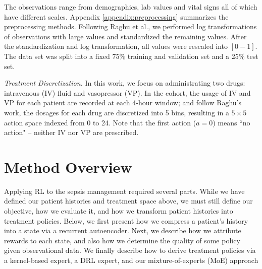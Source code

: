\documentclass[10pt]{amia}
\begin{document}

The observations range from demographics, lab values and vital signs all of which have different scales.  Appendix  \ref{appendix:preprocessing} summarizes the preprocessing methods. Following Raghu et al., \cite{DBLP:journals/corr/RaghuKCSG17} we performed log transformations of observations with large values and standardized the remaining values. After the standardization and log transformation, all values were rescaled into $[0-1]$.  The data set was split into a fixed 75\% training and validation set and a 25\% test set. 

\textit{Treatment Discretization.} In this work, we focus on administrating two drugs: intravenous (IV) fluid and vasopressor (VP). In the cohort, the usage of IV and VP for each patient are recorded at each 4-hour window; and follow Raghu's work\cite{DBLP:journals/corr/RaghuKCSG17}, the dosages for each drug are discretized into 5 bins, resulting in a $5\times5$ action space indexed from 0 to 24. Note that the first action ($a=0$) means ``no action" -- neither IV nor VP are prescribed.

\section*{Method Overview}

Applying RL to the sepsis management required several parts.  While we have defined our patient histories and treatment space above, we must still define our objective, how we evaluate it, and how we transform patient histories into treatment policies. Below, we first present how we compress a patient's history into a state via a recurrent autoencoder.  Next, we describe how we attribute rewards to each state, and also how we determine the quality of some policy given observational data. We finally describe how to derive treatment policies via a kernel-based expert, a DRL expert, and our mixture-of-experts (MoE) approach
\end{document}
